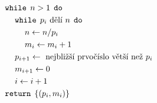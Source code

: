 \documentclass[preview]{standalone}
\begin{document}
\begin{align*}
&\mathtt{while} \:\: n > 1 \:\: \mathtt{do}\\ &\hspace*{12pt}\mathtt{while} \:\: p_i \text{ dělí } n \:\: \mathtt{do}\\ &\hspace*{24pt}n \leftarrow n / p_i\\ &\hspace*{24pt}m_i \leftarrow m_i + 1\\ &\hspace*{12pt}p_{i+1} \leftarrow \text{ nejbližší prvočíslo větší než } p_i\\ &\hspace*{12pt}m_{i+1} \leftarrow 0\\ &\hspace*{12pt}i \leftarrow i + 1\\ &\mathtt{return} \:\: \{(p_i, m_i)\}
\end{align*}
\end{document}

